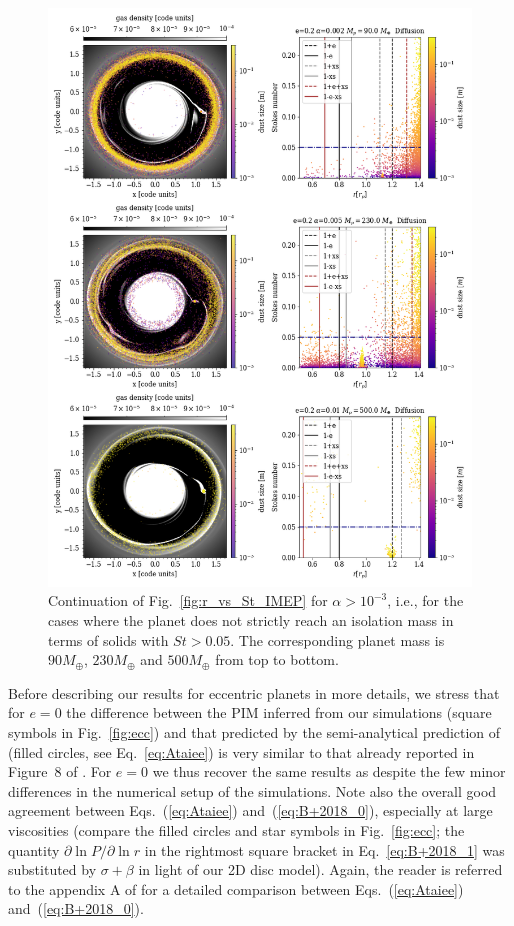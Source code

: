 \documentclass[fleqn,usenatbib]{mnras}
\begin{document}
\begin{figure}
	\includegraphics[scale=0.6]{IMEP_dens_dust2.png}
    \caption{Continuation of Fig.~\ref{fig:r_vs_St_IMEP} for $\alpha>10^{-3}$, i.e., for the cases where the planet does not strictly reach an isolation mass in terms of solids with $St > 0.05$. The corresponding planet mass is $90M_{\oplus}$, $230M_{\oplus}$ and $500M_{\oplus}$ from top to bottom.}
    \label{fig:gas_dust2}
\end{figure}


Before describing our results for eccentric planets in more details, we stress that for $e=0$ the difference between the PIM inferred from our simulations (square symbols in Fig.~\ref{fig:ecc}) and that predicted by the semi-analytical prediction of \citet{Ataiee_etal2018} (filled circles, see Eq.~\ref{eq:Ataiee}) is very similar to that already reported in Figure~8 of \citet{Ataiee_etal2018}. For $e=0$ we thus recover the same results as \citet{Ataiee_etal2018} despite the few minor differences in the numerical setup of the simulations. Note also the overall good agreement between Eqs.~(\ref{eq:Ataiee}) and~(\ref{eq:B+2018_0}), especially at large viscosities (compare the filled circles and star symbols in Fig.~\ref{fig:ecc}; the quantity $\partial\ln P / \partial\ln r$ in the rightmost square bracket in Eq.~\ref{eq:B+2018_1} was substituted by $\sigma+\beta$ in light of our 2D disc model). Again, the reader is referred to the appendix A of \citet{Ataiee_etal2018} for a detailed comparison between Eqs.~(\ref{eq:Ataiee}) and~(\ref{eq:B+2018_0}).
\end{document}
